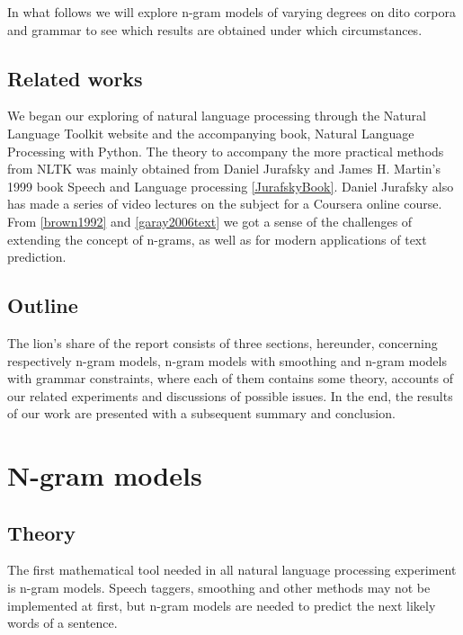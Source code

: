 \documentclass[a4paper,12pt]{article}
\begin{document}
In what follows we will explore n-gram models of varying degrees on dito corpora and grammar to see which results are obtained under which circumstances.

\subsection{Related works}
We began our exploring of natural language processing through the Natural Language Toolkit website and the accompanying book, Natural Language Processing with Python. The theory to accompany the more practical methods from NLTK was mainly obtained from Daniel Jurafsky and James H. Martin's 1999 book Speech and Language processing \ref{JurafskyBook}. Daniel Jurafsky also has made a series of video lectures on the subject for a Coursera online course. From \ref{brown1992} and \ref{garay2006text} we got a sense of the challenges of extending the concept of n-grams, as well as for modern applications of text prediction.

\subsection{Outline}
The lion's share of the report consists of three sections, hereunder, concerning respectively n-gram models, n-gram models with smoothing and n-gram models with grammar constraints, where each of them contains some theory, accounts of our related experiments and discussions of possible issues. In the end, the results of our work are presented with a subsequent summary and conclusion.

\section{N-gram models}
\label{sec:ngram}

\subsection{Theory}
The first mathematical tool needed in all natural language processing experiment is n-gram models. Speech taggers, smoothing and other methods may not be implemented at first, but n-gram models are needed to predict the next likely words of a sentence.
\end{document}
